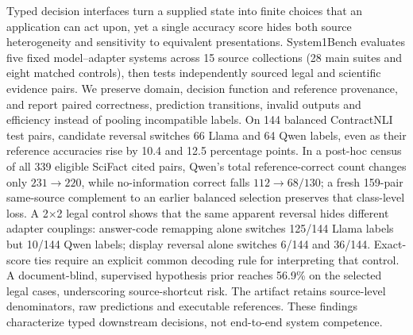 Typed decision interfaces turn a supplied state into finite choices that an application can act upon, yet a single accuracy score hides both source heterogeneity and sensitivity to equivalent presentations. System1Bench evaluates five fixed model--adapter systems across 15 source collections (28 main suites and eight matched controls), then tests independently sourced legal and scientific evidence pairs. We preserve domain, decision function and reference provenance, and report paired correctness, prediction transitions, invalid outputs and efficiency instead of pooling incompatible labels. On 144 balanced ContractNLI test pairs, candidate reversal switches 66 Llama and 64 Qwen labels, even as their reference accuracies rise by 10.4 and 12.5 percentage points. In a post-hoc census of all 339 eligible SciFact cited pairs, Qwen's total reference-correct count changes only $231\to220$, while no-information correct falls $112\to68/130$; a fresh 159-pair same-source complement to an earlier balanced selection preserves that class-level loss. A 2$\times$2 legal control shows that the same apparent reversal hides different adapter couplings: answer-code remapping alone switches 125/144 Llama labels but 10/144 Qwen labels; display reversal alone switches 6/144 and 36/144. Exact-score ties require an explicit common decoding rule for interpreting that control. A document-blind, supervised hypothesis prior reaches 56.9\% on the selected legal cases, underscoring source-shortcut risk. The artifact retains source-level denominators, raw predictions and executable references. These findings characterize typed downstream decisions, not end-to-end system competence.
